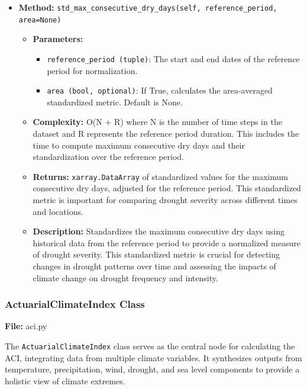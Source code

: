 \documentclass[a4paper,12pt]{article}
\begin{document}
\begin{itemize}
    \item \textbf{Method:} \texttt{std\_max\_consecutive\_dry\_days(self, reference\_period, area=None)}
    \begin{itemize}
        \item \textbf{Parameters:}
        \begin{itemize}
            \item \texttt{reference\_period (tuple)}: The start and end dates of the reference period for normalization.
            \item \texttt{area (bool, optional)}: If True, calculates the area-averaged standardized metric. Default is None.
        \end{itemize}
        \item \textbf{Complexity:} O(N + R) where N is the number of time steps in the dataset and R represents the reference period duration. This includes the time to compute maximum consecutive dry days and their standardization over the reference period.
        \item \textbf{Returns:} \texttt{xarray.DataArray} of standardized values for the maximum consecutive dry days, adjusted for the reference period. This standardized metric is important for comparing drought severity across different times and locations.
        \item \textbf{Description:} Standardizes the maximum consecutive dry days using historical data from the reference period to provide a normalized measure of drought severity. This standardized metric is crucial for detecting changes in drought patterns over time and assessing the impacts of climate change on drought frequency and intensity.
    \end{itemize}
\end{itemize}


\subsubsection{ActuarialClimateIndex Class}
\textbf{File:} aci.py

The \texttt{ActuarialClimateIndex} class serves as the central node for calculating the ACI, integrating data from multiple climate variables. It synthesizes outputs from temperature, precipitation, wind, drought, and sea level components to provide a holistic view of climate extremes.
\end{document}

